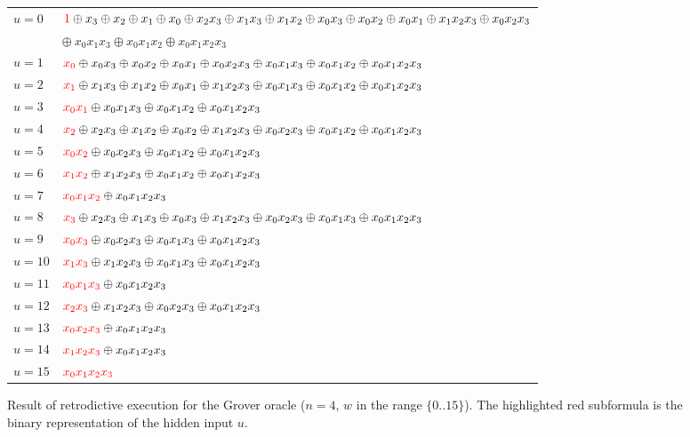 \documentclass{article}
\newcommand{\red}[1]{{\color{red}{#1}}}
\begin{document}
\begin{refsection}
\begin{figure}
\begin{tabular}{ll}
$u=0$ & 
  $\red{1} \oplus x_3 \oplus x_2 \oplus x_1 \oplus x_0 \oplus x_2x_3 \oplus x_1x_3 \oplus x_1x_2 \oplus x_0x_3 \oplus x_0x_2 \oplus x_0x_1 \oplus x_1x_2x_3 \oplus x_0x_2x_3$ \\
   &\quad $\oplus ~x_0x_1x_3 \oplus x_0x_1x_2 \oplus x_0x_1x_2x_3$ \\
$u=1$ & 
  $\red{x_0} \oplus x_0x_3 \oplus x_0x_2 \oplus x_0x_1 \oplus x_0x_2x_3 \oplus x_0x_1x_3 \oplus x_0x_1x_2 \oplus x_0x_1x_2x_3$ \\
$u=2$ &
  $\red{x_1} \oplus x_1x_3 \oplus x_1x_2 \oplus x_0x_1 \oplus x_1x_2x_3 \oplus x_0x_1x_3 \oplus x_0x_1x_2 \oplus x_0x_1x_2x_3$ \\
$u=3$ &
  $\red{x_0x_1} \oplus x_0x_1x_3 \oplus x_0x_1x_2 \oplus x_0x_1x_2x_3$ \\
$u=4$ &
  $\red{x_2} \oplus x_2x_3 \oplus x_1x_2 \oplus x_0x_2 \oplus x_1x_2x_3 \oplus x_0x_2x_3 \oplus x_0x_1x_2 \oplus x_0x_1x_2x_3$ \\
$u=5$ &
  $\red{x_0x_2} \oplus x_0x_2x_3 \oplus x_0x_1x_2 \oplus x_0x_1x_2x_3$ \\
$u=6$ &
  $\red{x_1x_2} \oplus x_1x_2x_3 \oplus x_0x_1x_2 \oplus x_0x_1x_2x_3$ \\
$u=7$ &
  $\red{x_0x_1x_2} \oplus x_0x_1x_2x_3$ \\
$u=8$ &
  $\red{x_3} \oplus x_2x_3 \oplus x_1x_3 \oplus x_0x_3 \oplus x_1x_2x_3 \oplus x_0x_2x_3 \oplus x_0x_1x_3 \oplus x_0x_1x_2x_3$ \\
$u=9$ &
  $\red{x_0x_3} \oplus x_0x_2x_3 \oplus x_0x_1x_3 \oplus x_0x_1x_2x_3$ \\
$u=10$ &
  $\red{x_1x_3} \oplus x_1x_2x_3 \oplus x_0x_1x_3 \oplus x_0x_1x_2x_3$ \\
$u=11$ &
  $\red{x_0x_1x_3} \oplus x_0x_1x_2x_3$ \\
$u=12$ &
  $\red{x_2x_3} \oplus x_1x_2x_3 \oplus x_0x_2x_3 \oplus x_0x_1x_2x_3$ \\
$u=13$ &
  $\red{x_0x_2x_3} \oplus x_0x_1x_2x_3$ \\
$u=14$ &
  $\red{x_1x_2x_3} \oplus x_0x_1x_2x_3$ \\
$u=15$ &
  $\red{x_0x_1x_2x_3}$
\end{tabular}
\caption{\label{fig:Grover}Result of retrodictive execution for the Grover oracle ($n=4$, $w$ in the range $\{0..15\}$). The highlighted red subformula is the binary representation of the hidden input $u$.}
\end{figure}


\end{refsection}
\end{document}
